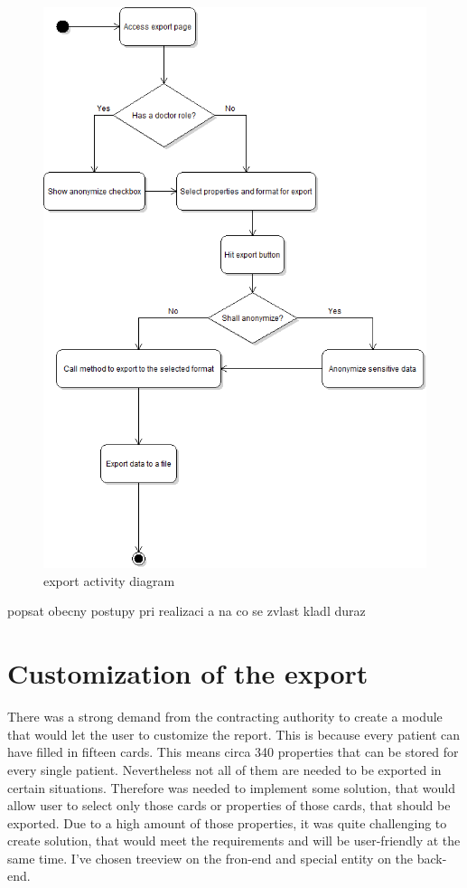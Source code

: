 \documentclass[thesis=B,english]{FITthesis}[2012/10/20]
\begin{document}
	\begin{figure}\centering
	\includegraphics[width=0.5\paperwidth]{exportDiagram}
		\caption{export activity diagram}\label{fig:logo}
	\end{figure}

popsat obecny postupy pri realizaci a na co se zvlast kladl duraz
\section{Customization of the export}
There was a strong demand from the contracting authority to create a module that would let the user to customize the report. This is because every patient can have filled in fifteen cards. This means circa 340 properties that can be stored for every single patient. Nevertheless not all of them are needed to be exported in certain situations. Therefore was needed to implement some solution, that would allow user to select only those cards or properties of those cards, that should be exported.
Due to a high amount of those properties, it was quite challenging to create solution, that would meet the requirements and will be user-friendly at the same time. I've chosen treeview on the fron-end and special entity on the back-end.
\end{document}

